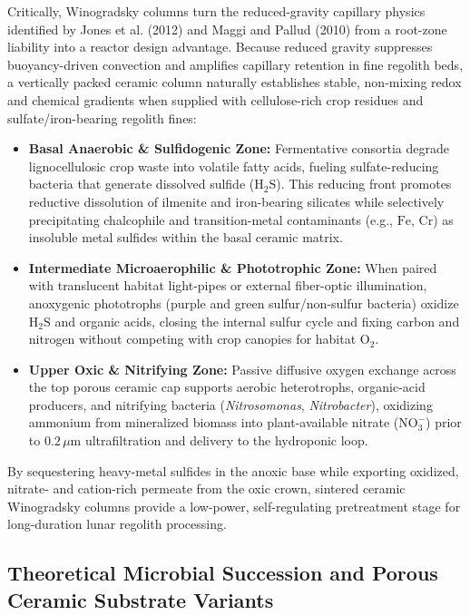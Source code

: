 Critically, Winogradsky columns turn the reduced-gravity capillary physics identified by Jones et al. (2012) and Maggi and Pallud (2010) from a root-zone liability into a reactor design advantage\cite{jones2012beyond,maggi2010space,maggi2010martian}. Because reduced gravity suppresses buoyancy-driven convection and amplifies capillary retention in fine regolith beds, a vertically packed ceramic column naturally establishes stable, non-mixing redox and chemical gradients when supplied with cellulose-rich crop residues and sulfate/iron-bearing regolith fines:
\begin{itemize}
    \item \textbf{Basal Anaerobic \& Sulfidogenic Zone:} Fermentative consortia degrade lignocellulosic crop waste into volatile fatty acids, fueling sulfate-reducing bacteria that generate dissolved sulfide ($\mathrm{H}_2\mathrm{S}$). This reducing front promotes reductive dissolution of ilmenite and iron-bearing silicates while selectively precipitating chalcophile and transition-metal contaminants (e.g., $\mathrm{Fe}$, $\mathrm{Cr}$) as insoluble metal sulfides within the basal ceramic matrix.
    \item \textbf{Intermediate Microaerophilic \& Phototrophic Zone:} When paired with translucent habitat light-pipes or external fiber-optic illumination, anoxygenic phototrophs (purple and green sulfur/non-sulfur bacteria) oxidize $\mathrm{H}_2\mathrm{S}$ and organic acids, closing the internal sulfur cycle and fixing carbon and nitrogen without competing with crop canopies for habitat $\mathrm{O}_2$.
    \item \textbf{Upper Oxic \& Nitrifying Zone:} Passive diffusive oxygen exchange across the top porous ceramic cap supports aerobic heterotrophs, organic-acid producers, and nitrifying bacteria (\textit{Nitrosomonas}, \textit{Nitrobacter}), oxidizing ammonium from mineralized biomass into plant-available nitrate ($\mathrm{NO}_3^-$) prior to $0.2\,\mu\mathrm{m}$ ultrafiltration and delivery to the hydroponic loop.
\end{itemize}
By sequestering heavy-metal sulfides in the anoxic base while exporting oxidized, nitrate- and cation-rich permeate from the oxic crown, sintered ceramic Winogradsky columns provide a low-power, self-regulating pretreatment stage for long-duration lunar regolith processing\cite{babcsanyi2017biogeochemical}.

\subsection{Theoretical Microbial Succession and Porous Ceramic Substrate Variants}
\label{subsec:microbial_succession_leca}

